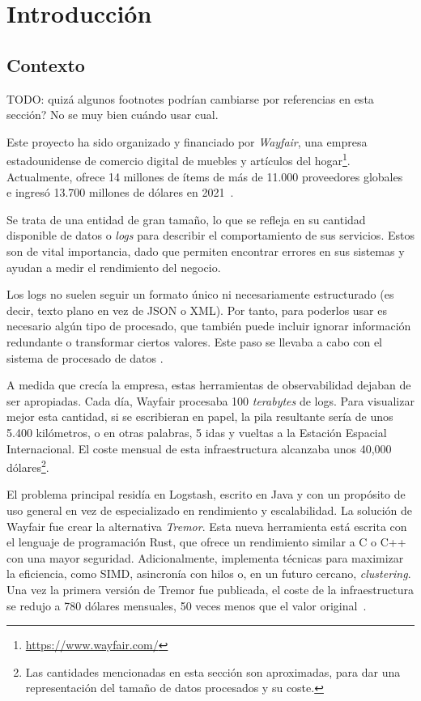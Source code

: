 
\chapter{Introducción}

\section{Contexto}

TODO: quizá algunos footnotes podrían cambiarse por referencias en esta sección?
No se muy bien cuándo usar cual.

Este proyecto ha sido organizado y financiado por \emph{Wayfair}, una empresa
estadounidense de comercio digital de muebles y artículos del
hogar\footnote{\url{https://www.wayfair.com/}}. Actualmente, ofrece 14 millones
de ítems de más de 11.000 proveedores globales~\cite{wayfairItems} e ingresó
13.700 millones de dólares en 2021~\cite{wayfairRevenue}.

Se trata de una entidad de gran tamaño, lo que se refleja en su cantidad
disponible de datos o \emph{logs} para describir el comportamiento de sus
servicios. Estos son de vital importancia, dado que permiten encontrar errores
en sus sistemas y ayudan a medir el rendimiento del negocio.

Los logs no suelen seguir un formato único ni necesariamente estructurado (es
decir, texto plano en vez de JSON o XML). Por tanto, para poderlos usar es
necesario algún tipo de procesado, que también puede incluir ignorar información
redundante o transformar ciertos valores. Este paso se llevaba a cabo con el
sistema de procesado de datos \textcite{logstash}.

A medida que crecía la empresa, estas herramientas de observabilidad dejaban de
ser apropiadas. Cada día, Wayfair procesaba 100 \emph{terabytes} de logs. Para
visualizar mejor esta cantidad, si se escribieran en papel, la pila resultante
sería de unos 5.400 kilómetros, o en otras palabras, 5 idas y vueltas a la
Estación Espacial Internacional. El coste mensual de esta infraestructura
alcanzaba unos 40,000 dólares\footnote{Las cantidades mencionadas en esta
sección son aproximadas, para dar una representación del tamaño de datos
procesados y su coste.}.

El problema principal residía en Logstash, escrito en Java y con un propósito de
uso general en vez de especializado en rendimiento y escalabilidad. La solución
de Wayfair fue crear la alternativa \emph{Tremor}. Esta nueva herramienta está
escrita con el lenguaje de programación Rust, que ofrece un rendimiento similar
a C o C++ con una mayor seguridad. Adicionalmente, implementa técnicas para
maximizar la eficiencia, como SIMD, asincronía con hilos o, en un futuro
cercano, \emph{clustering}. Una vez la primera versión de Tremor fue publicada,
el coste de la infraestructura se redujo a 780 dólares mensuales, 50 veces menos
que el valor original~\cite{tremorcon_lll}.

